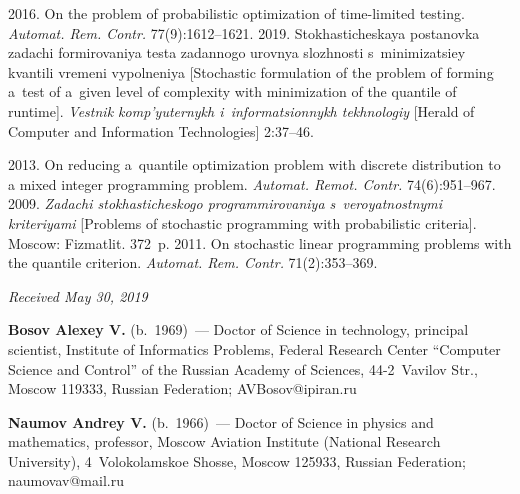 \begin{multicols}{2}
{{\begin{thebibliography}{99}
     2016. On the problem of 
probabilistic optimization of time-limited testing. 
\textit{Automat. Rem. Contr.} 77(9):1612--1621.
     2019. 
Stokhasticheskaya postanovka zadachi formirovaniya testa zadannogo urovnya 
slozhnosti s~mi\-ni\-mi\-za\-tsi\-ey kvantili vremeni vypolneniya [Stochastic formulation of 
the problem of forming a~test of a~given level of complexity with minimization of the 
quantile of runtime]. \textit{Vestnik komp'yuternykh i~informatsionnykh tekhnologiy} 
[Herald of Computer and Information Technologies] 2:37--46.
   
     2013. On reducing 
    a~quantile optimization problem with discrete distribution to a mixed integer 
programming problem. \textit{Automat. Remot. Contr.} 74(6):951--967.
     2009. \textit{Zadachi sto\-kha\-sti\-che\-sko\-go 
programmirovaniya s~veroyatnostnymi kriteriyami} [Problems of stochastic 
programming with probabilistic criteria]. Moscow: Fizmatlit. 372~p.
     2011. On stochastic linear programming 
problems with the quantile criterion. \textit{Automat. Rem. Contr.} 71(2):353--369.
 \end{thebibliography}

 }
 }

\end{multicols}


\hfill{\small\textit{Received May 30, 2019}}


   

    
    \Contr
    
    \noindent
    \textbf{Bosov Alexey V.} (b.\ 1969)~--- Doctor of Science in 
technology, principal scientist, Institute of Informatics Problems, Federal 
Research Center ``Computer Science and Control'' of the Russian 
Academy of Sciences, 44-2~Vavilov Str., Moscow 119333, Russian 
Federation; \mbox{AVBosov@ipiran.ru}
    
    \noindent
    \textbf{Naumov Andrey V.} (b.\ 1966)~--- Doctor of Science in 
physics and mathematics, professor, Moscow Aviation Institute (National 
Research University), 4~Volokolamskoe Shosse, Moscow 125933, 
Russian Federation; \mbox{naumovav@mail.ru}
    
